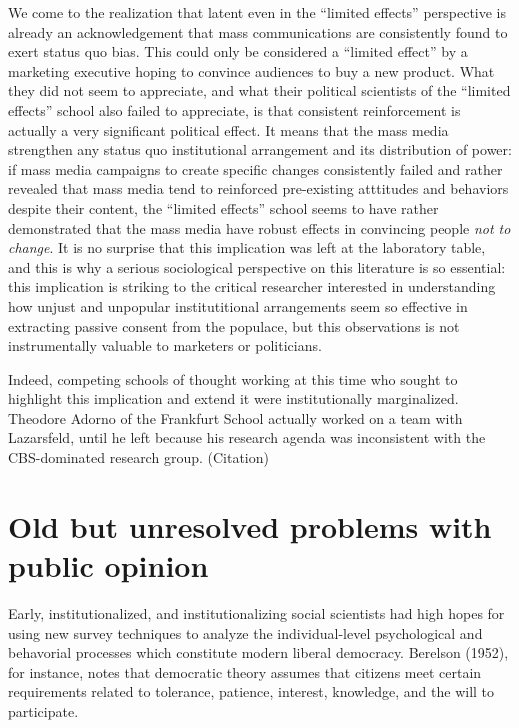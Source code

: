 \documentclass[12pt,book]{article}
\begin{document}
We come to the realization that latent even in the ``limited effects''
perspective is already an acknowledgement that mass communications are
consistently found to exert status quo bias. This could only be
considered a ``limited effect'' by a marketing executive hoping to
convince audiences to buy a new product. What they did not seem to
appreciate, and what their political scientists of the ``limited
effects'' school also failed to appreciate, is that consistent
reinforcement is actually a very significant political effect. It means
that the mass media strengthen any status quo institutional arrangement
and its distribution of power: if mass media campaigns to create
specific changes consistently failed and rather revealed that mass media
tend to reinforced pre-existing atttitudes and behaviors despite their
content, the ``limited effects'' school seems to have rather
demonstrated that the mass media have robust effects in convincing
people \emph{not to change}. It is no surprise that this implication was
left at the laboratory table, and this is why a serious sociological
perspective on this literature is so essential: this implication is
striking to the critical researcher interested in understanding how
unjust and unpopular institutitional arrangements seem so effective in
extracting passive consent from the populace, but this observations is
not instrumentally valuable to marketers or politicians.

Indeed, competing schools of thought working at this time who sought to
highlight this implication and extend it were institutionally
marginalized. Theodore Adorno of the Frankfurt School actually worked on
a team with Lazarsfeld, until he left because his research agenda was
inconsistent with the CBS-dominated research group. (Citation)

\section{Old but unresolved problems with public
opinion}\label{old-but-unresolved-problems-with-public-opinion}

Early, institutionalized, and institutionalizing social scientists had
high hopes for using new survey techniques to analyze the
individual-level psychological and behavorial processes which constitute
modern liberal democracy. Berelson (1952), for instance, notes that
democratic theory assumes that citizens meet certain requirements
related to tolerance, patience, interest, knowledge, and the will to
participate.
\end{document}
